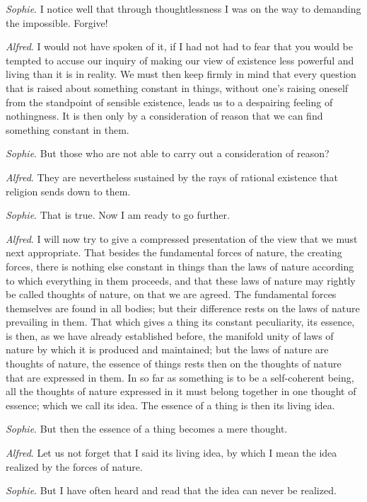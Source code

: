 \documentclass[12pt,a4paper,openany]{book}
\newcommand{\opage}[1]{\marginnote{\footnotesize\textit{[#1]}}}
\begin{document}
\emph{Sophie}. I notice well that through thoughtlessness I was on the way to
demanding the impossible. Forgive!

\emph{Alfred}. I would not have spoken of it, if I had not had to fear that you
would be tempted to accuse our inquiry of making our view of existence less
powerful and living than it is in reality. We must then keep firmly in mind that
every question that is raised about something constant in things, without one's
raising oneself from the standpoint of sensible existence, leads us to a despairing
feeling of nothingness. It is then only by a consideration of reason that we can
find something constant in them.

\emph{Sophie}. But those who are not able to carry out a consideration of reason?


\emph{Alfred}. They are nevertheless sustained by the rays of rational existence
that religion sends down to them.

\emph{Sophie}. That is true. Now I am ready to go further.


\emph{Alfred}. I will now try to give a compressed presentation of the view that we
must next appropriate. That besides the fundamental forces of nature, the creating
forces, there is nothing else constant in things than the laws of nature according
to which everything in them proceeds, and that these laws of nature may rightly be
called thoughts of nature, on that we are agreed. The fundamental forces themselves
are found in all bodies; but their difference rests on the laws of nature prevailing
in them. That which gives a thing its
\setcounter{footnote}{0}%
\opage{64}constant peculiarity, its essence, is then, as we have already established before,
the manifold unity of laws of nature by which it is produced and maintained; but the
laws of nature are thoughts of nature, the essence of things rests then on the
thoughts of nature that are expressed in them. In so far as something is to be a
self-coherent being, all the thoughts of nature expressed in it must belong together
in one thought of essence; which we call its idea. The essence of a thing is then
its living idea.

\emph{Sophie}. But then the essence of a thing becomes a mere thought.

\emph{Alfred}. Let us not forget that I said its living idea, by which I mean the
idea realized by the forces of nature.

\emph{Sophie}. But I have often heard and read that the idea can never be realized.
\end{document}
